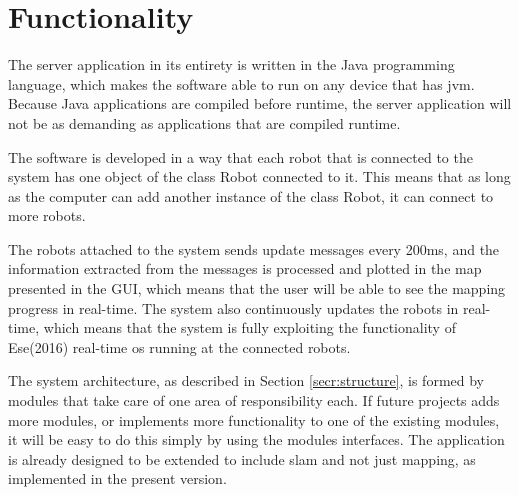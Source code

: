 \newpage
\section{Functionality}
\label{secr:functionality}
The server application in its entirety is written in the Java programming language, which makes the software able to run on any device that has \acrlong{jvm}. Because Java applications are compiled before runtime, the server application will not be as demanding as applications that are compiled runtime.

The software is developed in a way that each robot that is connected to the system has one object of the class Robot connected to it. This means that as long as the computer can add another instance of the class Robot, it can connect to more robots.

The robots attached to the system sends update messages every 200ms, and the information extracted from the messages is processed and plotted in the map presented in the GUI, which means that the user will be able to see the mapping progress in real-time. The system also continuously updates the robots in real-time, which means that the system is fully exploiting the functionality of Ese(2016) real-time \acrshort{os} running at the connected robots.

The system architecture, as described in Section \ref{secr:structure}, is formed by modules that take care of one area of responsibility each. If future projects adds more modules, or implements more functionality to one of the existing modules, it will be easy to do this simply by using the modules interfaces. The application is already designed to be extended to include \acrfull{slam} and not just mapping, as implemented in the present version.